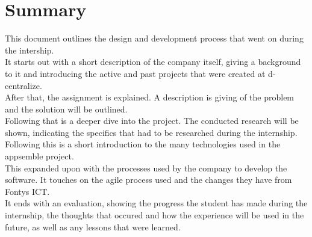 \chapter{Summary}
This document outlines the design and development process that went on during the intership. \\

It starts out with a short description of the company itself, giving a background to it and introducing the active and past projects that were created at d-centralize. \\

After that, the assignment is explained. A description is giving of the problem and the solution will be outlined. \\

Following that is a deeper dive into the project. The conducted research will be shown, indicating the specifics that had to be researched during the internship. Following this is  a short introduction to the many technologies used in the appsemble project. \\ 

This expanded upon with the processes used by the company to develop the software. It touches on the agile process used and the changes they have from Fontys ICT. \\

It ends with an evaluation, showing the progress the student has made during the internship, the thoughts that occured and how the experience will be used in the future, as well as any lessons that were learned.